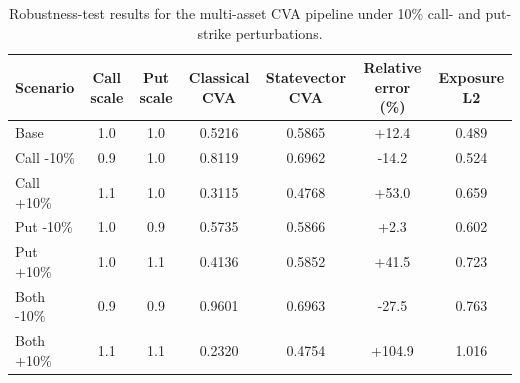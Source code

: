 \begin{table}
\caption{Robustness-test results for the multi-asset CVA pipeline under 10\% call- and put-strike perturbations.}
\label{tab:cva_robustness_results}
\begin{tabular}{lcccccc}
\toprule
Scenario & Call scale & Put scale & Classical CVA & Statevector CVA & Relative error (\%) & Exposure L2 \\
\midrule
Base & 1.0 & 1.0 & 0.5216 & 0.5865 & +12.4 & 0.489 \\
Call -10\% & 0.9 & 1.0 & 0.8119 & 0.6962 & -14.2 & 0.524 \\
Call +10\% & 1.1 & 1.0 & 0.3115 & 0.4768 & +53.0 & 0.659 \\
Put -10\% & 1.0 & 0.9 & 0.5735 & 0.5866 & +2.3 & 0.602 \\
Put +10\% & 1.0 & 1.1 & 0.4136 & 0.5852 & +41.5 & 0.723 \\
Both -10\% & 0.9 & 0.9 & 0.9601 & 0.6963 & -27.5 & 0.763 \\
Both +10\% & 1.1 & 1.1 & 0.2320 & 0.4754 & +104.9 & 1.016 \\
\bottomrule
\end{tabular}
\end{table}
